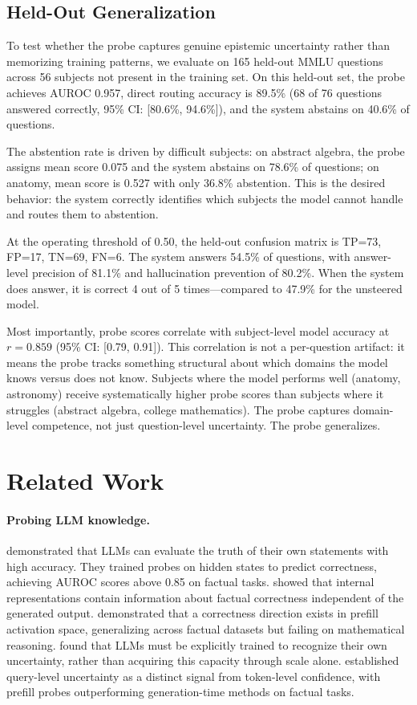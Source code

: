 \documentclass{article}
\begin{document}
\subsection{Held-Out Generalization}

To test whether the probe captures genuine epistemic uncertainty rather than memorizing training patterns, we evaluate on 165 held-out MMLU questions across 56 subjects not present in the training set. On this held-out set, the probe achieves AUROC 0.957, direct routing accuracy is 89.5\% (68 of 76 questions answered correctly, 95\% CI: [80.6\%, 94.6\%]), and the system abstains on 40.6\% of questions.

The abstention rate is driven by difficult subjects: on abstract algebra, the probe assigns mean score 0.075 and the system abstains on 78.6\% of questions; on anatomy, mean score is 0.527 with only 36.8\% abstention. This is the desired behavior: the system correctly identifies which subjects the model cannot handle and routes them to abstention.

At the operating threshold of 0.50, the held-out confusion matrix is TP=73, FP=17, TN=69, FN=6. The system answers 54.5\% of questions, with answer-level precision of 81.1\% and hallucination prevention of 80.2\%. When the system does answer, it is correct 4 out of 5 times---compared to 47.9\% for the unsteered model.

Most importantly, probe scores correlate with subject-level model accuracy at $r=0.859$ (95\% CI: [0.79, 0.91]). This correlation is not a per-question artifact: it means the probe tracks something structural about which domains the model knows versus does not know. Subjects where the model performs well (anatomy, astronomy) receive systematically higher probe scores than subjects where it struggles (abstract algebra, college mathematics). The probe captures domain-level competence, not just question-level uncertainty. The probe generalizes.

\section{Related Work}

\paragraph{Probing LLM knowledge.}
\citet{kadavath2022language} demonstrated that LLMs can evaluate the truth of their own statements with high accuracy. They trained probes on hidden states to predict correctness, achieving AUROC scores above 0.85 on factual tasks. \citet{azaria2023internal} showed that internal representations contain information about factual correctness independent of the generated output. \citet{noanswer2025} demonstrated that a correctness direction exists in prefill activation space, generalizing across factual datasets but failing on mathematical reasoning. \citet{kapoor2024large} found that LLMs must be explicitly trained to recognize their own uncertainty, rather than acquiring this capacity through scale alone. \citet{duan2026query} established query-level uncertainty as a distinct signal from token-level confidence, with prefill probes outperforming generation-time methods on factual tasks.
\end{document}
